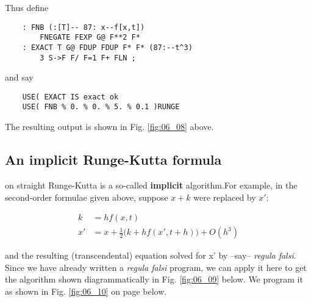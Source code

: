 Thus define

\begin{lstlisting}
    : FNB (:[T]-- 87: x--f[x,t])
        FNEGATE FEXP G@ F**2 F*
    : EXACT T G@ FDUP FDUP F* F* (87:--t^3)
        3 S->F F/ F=1 F+ FLN ;
\end{lstlisting}

and say

\begin{lstlisting}
    USE( EXACT IS exact ok
    USE( FNB % 0. % 0. % 5. % 0.1 )RUNGE
\end{lstlisting}

The resulting output is shown in Fig. \ref{fig:06_08} above.

\subsection{An implicit Runge-Kutta formula}
 on straight Runge-Kutta is a so-called \textbf{implicit} algorithm.For example, in the second-order formulae given above, suppose $x + k$ were replaced by $x'$:

\begin{equation}
\begin{aligned}
    k &= hf(x,t)\\
    x' &= x + \frac{1}{2}\big(k + hf(x',t+h)\big) + O(h^3)
    \label{eq:06_23} 
\end{aligned}
\end{equation}

and the resulting (transcendental) equation solved for x' by --say-- \textit{regula falsi}. Since we have already written a \textit{regula falsi} program, we can apply it here to get the algorithm shown diagrammatically in Fig. \ref{fig:06_09} below. We program it as shown in Fig. \ref{fig:06_10} on page \pageref{fig:06_10} below.

